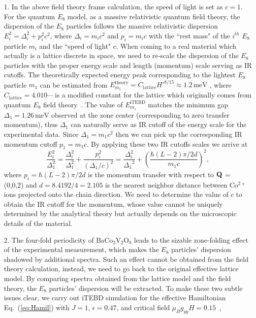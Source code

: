 \documentclass[aps,prl,twocolumn,superscriptaddress,groupedaddress]{revtex4}
\begin{document}
1. In the above field theory frame calculation, the speed of light is set as $c=1$. For the quantum $E_8$ model, as a massive relativistic quantum field theory, the dispersion of the $E_8$ particles follows the massive relativistic dispersion $E_i^2 = \Delta _i^2 + p_i^2{c^2}$, where $\Delta_i = m_i c^2$ and $p_i = m_i c$ with the ``rest mass" of the $i^{th}$ $E_8$ particle $m_i$ and the ``speed of light" $c$. When coming to a real material which actually is a lattice discrete in space, we need to re-scale the dispersion of the $E_8$ particles with the proper energy scale and length (momentum) scale serving as IR cutoffs. The theoretically expected energy peak corresponding to the lightest $E_{8}$ particle $m_{1}$ can be estimated from $E_{m_{1}}^{\text{theory}}=C_{\text{lattice}}H'^{8/15} \approx 1.2 \, \text{meV}$
\cite{Yang_2023}, where $C_{\text{lattice}} = 4.010\cdots$ is a modified constant for the lattice which originally comes from quantum $E_{8}$ field theory~\cite{E8_lattice}.
The value of $E_{m_{1}}^{\text{iTEBD}}$ matches the minimum gap
$\Delta_1 = 1.26 \,\text{meV}$ observed at the zone center (corresponding to zero transfer momentum), thus $\Delta_1$ can naturally serve as IR cutoff of the energy scale for the experimental data.
Since $\Delta_1 = m_1 c^2$ then we can pick up the corresponding IR momentum cutoff $p_1 = m_1 c$. By applying these two IR cutoffs scales we arrive at
\begin{equation}
\frac{{E_i^2}}{{{\Delta_{1}^{2}}}} = \frac{{\Delta _i^2}}{{\Delta_{1}^{2}}} + \frac{{p_i^2}}{(\Delta_{1}/c)^{2}}= \frac{{\Delta_i^2}}{{{{\Delta_1}^2}}} + \left( {\frac{{\hbar (L - 2)\pi /2d}}{{{m_1}c}}} \right)^2,
\label{eq:fit}
\end{equation}
where $p_i=\hbar(L - 2)\pi /2d$ is the momentum transfer with respect to ${\bf Q}$ = (0,0,2) and $d=8.4192/4=2.105$ is the nearest neighbor distance between Co$^{2+}$ ions projected onto the chain direction.
We need to determine the value of $c$ to obtain the IR cutoff for the momentum, whose value cannot be uniquely determined by the analytical theory but actually depends on the microscopic details of the material.

2. The four-fold periodicity of BaCo$_2$V$_2$O$_8$ leads to the sizable zone-folding effect of the experimental measurement, which makes the $E_{8}$ particles' dispersion shadowed by additional spectra. Such an effect cannot be obtained from the field theory calculation, instead, we need to go back to the original effective lattice model. By comparing spectra obtained from the lattice model and the field theory, the $E_{8}$ particles' dispersion will be extracted. To make these two subtle issues clear, we carry out iTEBD simulation for the effective Hamiltonian Eq.~(\ref{eq:Hamil})
with $J=1$, $\epsilon=0.47$, and critical field $\mu_B g_{yy}H=0.15$~\cite{Zou_2019,Zou_2021},
\end{document}
